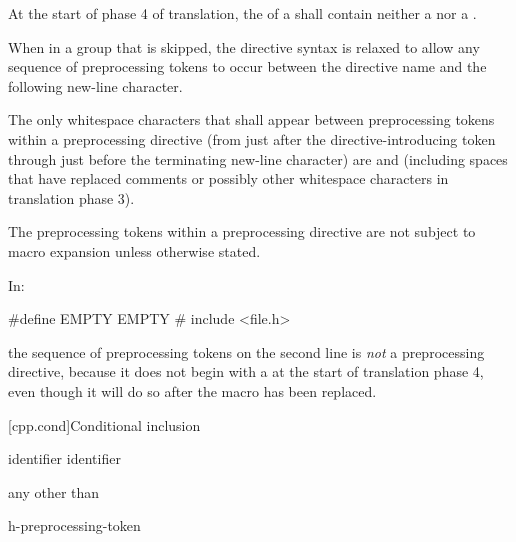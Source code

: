 \pnum
At the start of phase 4 of translation,
the  of a  shall
contain neither a  nor a .

\pnum
When in a group that is skipped, the directive
syntax is relaxed to allow any sequence of preprocessing tokens to occur between
the directive name and the following new-line character.

\pnum
The only whitespace characters that shall appear
between preprocessing tokens
within a preprocessing directive
(from just after the directive-introducing token
through just before the terminating new-line character)
are  and 
(including spaces that have replaced comments
or possibly other whitespace characters
in translation phase 3).

\pnum
The preprocessing tokens within a preprocessing directive
are not subject to macro expansion unless otherwise stated.

\begin{example}
In:
\begin{codeblock}
#define EMPTY
EMPTY   #   include <file.h>
\end{codeblock}
the sequence of preprocessing tokens on the second line is \textit{not}
a preprocessing directive, because it does not begin with a \tcode{\#} at the start of
translation phase 4, even though it will do so after the macro 
has been replaced.
\end{example}

[cpp.cond]{Conditional inclusion}%
%

%
\begin{bnf}
\br
     identifier\br
     identifier \terminal{)}
\end{bnf}

\begin{bnf}
\br
    \textnormal{any  other than \terminal{>}}
\end{bnf}

\begin{bnf}
\br
    h-preprocessing-token 
\end{bnf}


